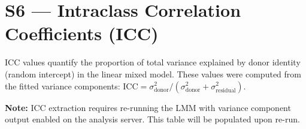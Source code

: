 \documentclass[11pt,a4paper]{article}
\begin{document}
\section*{S6 — Intraclass Correlation Coefficients (ICC)}
ICC values quantify the proportion of total variance explained by donor identity 
(random intercept) in the linear mixed model. These values were computed from the 
fitted variance components: $\text{ICC} = \sigma^2_{\text{donor}} / (\sigma^2_{\text{donor}} + \sigma^2_{\text{residual}})$.

\textbf{Note:} ICC extraction requires re-running the LMM with variance component 
output enabled on the analysis server. This table will be populated upon re-run.
\end{document}
